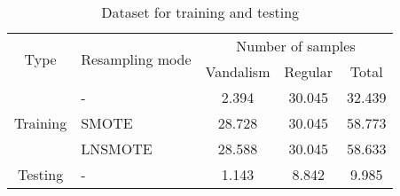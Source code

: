\begin{table}[tp]
\caption{Dataset for training and testing}
\label{table:dataset}
\centering
\begin{tabular}{c | l | c | c | c}
\hline
\multirow{2}{*}{Type} & \multirow{2}{*}{Resampling mode}
	& \multicolumn{3}{c}{Number of samples} \\
\cline{3-5}
    & & Vandalism & Regular & Total \\
\hline
\hline
\multirow{3}{*}{Training} & -       &  2.394 & 30.045 & 32.439 \\
                              & SMOTE   & 28.728 & 30.045 & 58.773 \\
                              & LNSMOTE & 28.588 & 30.045 & 58.633 \\
\hline
Testing & - & 1.143 & 8.842 & 9.985 \\
\hline
\end{tabular}
\end{table}
